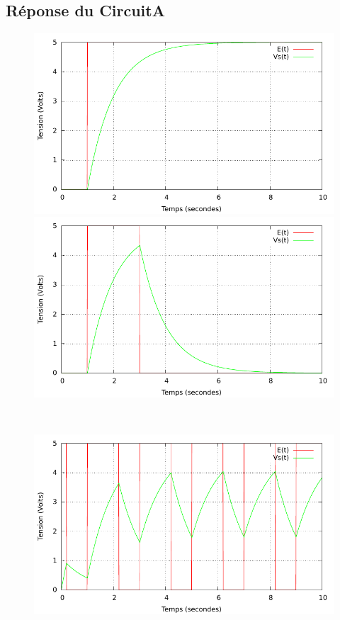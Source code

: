 \documentclass[a4paper,11pt]{article}
\begin{document}
  \subsection{Réponse du CircuitA}
\begin{figure}[h!]
   \begin{minipage}[b]{0.5\linewidth}
      \centering \includegraphics[scale=0.68]{CAechelon.pdf}
   \end{minipage}\hfill
   \begin{minipage}[b]{0.5\linewidth}   
      \centering \includegraphics[scale=.68]{CAporte.pdf}
   \end{minipage}\\
    \begin{minipage}[b]{0.5\linewidth}   
      \centering \includegraphics[scale=.68]{CAcarre.pdf}

\end{minipage}
\end{figure}
\end{document}
